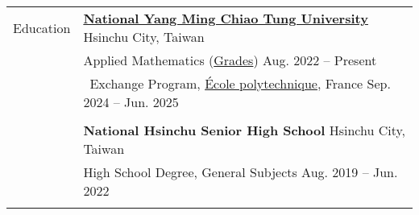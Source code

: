 \documentclass[letterpaper, 11pt]{article}
\begin{document}
\setlength{\tabcolsep}{8pt}
\vspace{-1.5em}
\begin{center}
    \begin{longtable}{p{0.76in}p{5.93in}}

        
        
        
        \textcolor{OliveGreen}{Education} 
        & \href{https://www.nycu.edu.tw/nycu/en/index}{\textbf{National Yang Ming Chiao Tung University}} \hfill Hsinchu City, Taiwan \\ 
        & Applied Mathematics (\href{https://docs.google.com/spreadsheets/d/1hz9FwNdFio4EajAw5VN3lpa6QyxIE2GJ6FpHmMoSaaQ/edit?usp=sharing}{Grades}) \hfill Aug. 2022 -- Present \\
        & \qquad \  Exchange Program, \href{https://www.polytechnique.edu}{\'Ecole polytechnique}, France \hfill Sep. 2024 -- Jun. 2025 \\
        & \\
        
        & \textbf{National Hsinchu Senior High School} \hfill Hsinchu City, Taiwan \\
        & High School Degree, General Subjects \hfill Aug. 2019 -- Jun. 2022\\
        & \\
        
        

\end{longtable}
\end{center}
\end{document}

